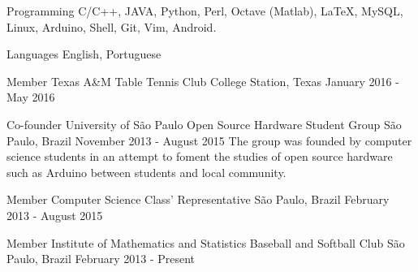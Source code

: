 \documentclass[11pt, a4paper]{awesome-cv-res}
\begin{document}
\begin{cvskills}
\cvskill
{Programming} %
{C/C++, JAVA, Python, Perl, Octave (Matlab), LaTeX, MySQL, Linux, 
Arduino, Shell, Git, Vim, Android.} %

\cvskill
{Languages} %
{English, Portuguese} %
\end{cvskills}

\begin{cventries}

\cventry
{Member}
{Texas A\&M Table Tennis Club}
{College Station, Texas}
{January 2016 - May 2016}
{}

\cventry
{Co-founder}
{University of São Paulo Open Source Hardware Student Group}
{São Paulo, Brazil}
{November 2013 - August 2015}
{The group was founded by computer science students in an attempt to foment the studies of open source hardware such as Arduino between students and local community.}
\newline
\newline

\cventry
{Member}
{Computer Science Class' Representative}
{São Paulo, Brazil}
{February 2013 - August 2015}
{}

\cventry
{Member}
{Institute of Mathematics and Statistics Baseball and Softball Club}
{São Paulo, Brazil}
{February 2013 - Present}
{}

\end{cventries}
\end{document}
